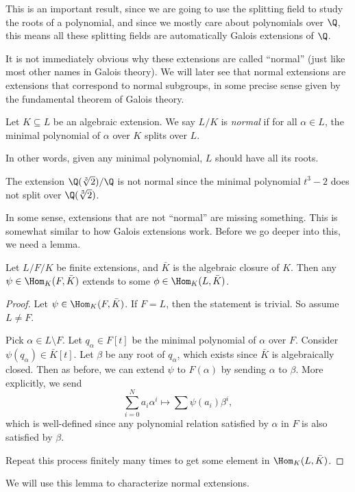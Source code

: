 \documentclass[a4paper]{article}
\begin{document}
This is an important result, since we are going to use the splitting field to study the roots of a polynomial, and since we mostly care about polynomials over $\Q$, this means all these splitting fields are automatically Galois extensions of $\Q$.

It is not immediately obvious why these extensions are called ``normal'' (just like most other names in Galois theory). We will later see that normal extensions are extensions that correspond to normal subgroups, in some precise sense given by the fundamental theorem of Galois theory.

\begin{defi}
  Let $K \subseteq L$ be an algebraic extension. We say $L/K$ is \emph{normal} if for all $\alpha \in L$, the minimal polynomial of $\alpha$ over $K$ splits over $L$.
\end{defi}
In other words, given any minimal polynomial, $L$ should have all its roots.

\begin{eg}
  The extension $\Q(\sqrt[3]{2})/\Q$ is not normal since the minimal polynomial $t^3 - 2$ does not split over $\Q(\sqrt[3]{2})$.
\end{eg}
In some sense, extensions that are not ``normal'' are missing something. This is somewhat similar to how Galois extensions work. Before we go deeper into this, we need a lemma.

\begin{lemma}
  Let $L/F/K$ be finite extensions, and $\bar K$ is the algebraic closure of $K$. Then any $\psi \in \Hom_K(F, \bar K)$ extends to some $\phi \in \Hom_K(L, \bar K)$.
\end{lemma}

\begin{proof}
  Let $\psi \in \Hom_K(F, \bar K)$. If $F = L$, then the statement is trivial. So assume $L \not= F$.

  Pick $\alpha \in L\setminus F$. Let $q_\alpha \in F[t]$ be the minimal polynomial of $\alpha$ over $F$. Consider $\psi(q_\alpha) \in \bar{K} [t]$. Let $\beta$ be any root of $q_\alpha$, which exists since $\bar{K}$ is algebraically closed. Then as before, we can extend $\psi$ to $F(\alpha)$ by sending $\alpha$ to $\beta$. More explicitly, we send
  \[
    \sum_{i = 0}^N a_i \alpha^i \mapsto \sum \psi(a_i) \beta^i,
  \]
  which is well-defined since any polynomial relation satisfied by $\alpha$ in $F$ is also satisfied by $\beta$.

  Repeat this process finitely many times to get some element in $\Hom_K(L, \bar{K})$.
\end{proof}
We will use this lemma to characterize normal extensions.
\end{document}

